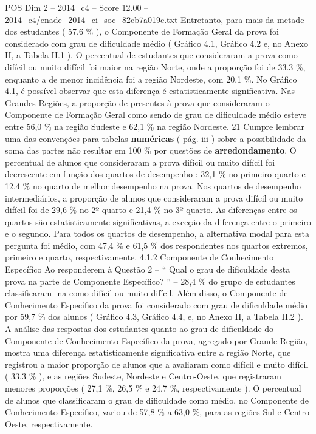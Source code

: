 \begin{textsample}{POS Dim 2 – 2014\_c4 – Score 12.00 – 2014\_c4/enade\_2014\_ci\_soc\_82cb7a019c.txt}
Entretanto, para mais da metade dos estudantes ( 57,6 \% ), o Componente de Formação Geral da prova foi considerado com grau de dificuldade médio ( Gráfico 4.1, Gráfico 4.2 e, no Anexo II, a Tabela II.1 ).
O percentual de estudantes que consideraram a prova como difícil ou muito difícil foi maior na região Norte, onde a proporção foi de 33.3 \%, enquanto a de menor incidência foi a região Nordeste, com 20,1 \%.
No Gráfico 4.1, é possível observar que esta diferença é estatisticamente significativa.
Nas Grandes Regiões, a proporção de presentes à prova que consideraram o Componente de Formação Geral como sendo de grau de dificuldade médio esteve entre 56,0 \% na região Sudeste e 62,1 \% na região Nordeste. 21 Cumpre lembrar uma das convenções para tabelas \textbf{numéricas} ( pág. iii ) sobre a possibilidade da soma das partes não resultar em 100 \% por questões de \textbf{arredondamento}.
O percentual de alunos que consideraram a prova difícil ou muito difícil foi decrescente em função dos quartos de desempenho : 32,1 \% no primeiro quarto e 12,4 \% no quarto de melhor desempenho na prova.
Nos quartos de desempenho intermediários, a proporção de alunos que consideraram a prova difícil ou muito difícil foi de 29,6 \% no 2º quarto e 21,4 \% no 3º quarto.
As diferenças entre os quartos são estatisticamente significativas, a exceção da diferença entre o primeiro e o segundo.
Para todos os quartos de desempenho, a alternativa modal para esta pergunta foi médio, com 47,4 \% e 61,5 \% dos respondentes nos quartos extremos, primeiro e quarto, respectivamente. 4.1.2 Componente de Conhecimento Específico Ao responderem à Questão 2 – “ Qual o grau de dificuldade desta prova na parte de Componente Específico? ” – 28,4 \% do grupo de estudantes classificaram -na como difícil ou muito difícil.
Além disso, o Componente de Conhecimento Específico da prova foi considerado com grau de dificuldade médio por 59,7 \% dos alunos ( Gráfico 4.3, Gráfico 4.4, e, no Anexo II, a Tabela II.2 ).
A análise das respostas dos estudantes quanto ao grau de dificuldade do Componente de Conhecimento Específico da prova, agregado por Grande Região, mostra uma diferença estatisticamente significativa entre a região Norte, que registrou a maior proporção de alunos que a avaliaram como difícil e muito difícil ( 33,3 \% ), e as regiões Sudeste, Nordeste e Centro-Oeste, que registraram menores proporções ( 27,1 \%, 26,5 \% e 24,7 \%, respectivamente ).
O percentual de alunos que classificaram o grau de dificuldade como médio, no Componente de Conhecimento Específico, variou de 57,8 \% a 63,0 \%, para as regiões Sul e Centro Oeste, respectivamente.

\end{textsample}
